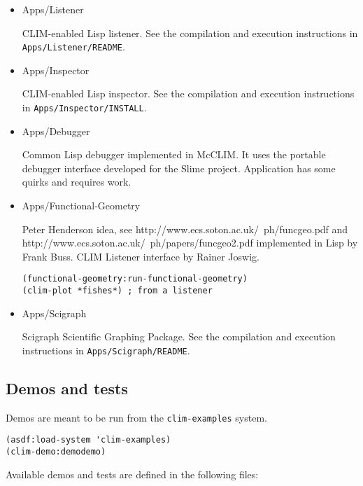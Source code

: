 \begin{itemize}
\item Apps/Listener

  CLIM-enabled Lisp listener.  See the compilation and execution
  instructions in \texttt{Apps/Listener/README}.

\item Apps/Inspector

  CLIM-enabled Lisp inspector.  See the compilation and execution
  instructions in \texttt{Apps/Inspector/INSTALL}.

\item Apps/Debugger

  Common Lisp debugger implemented in McCLIM. It uses the portable
  debugger interface developed for the Slime project. Application has
  some quirks and requires work.

\item Apps/Functional-Geometry

  Peter Henderson idea, see http://www.ecs.soton.ac.uk/~ph/funcgeo.pdf
  and http://www.ecs.soton.ac.uk/~ph/papers/funcgeo2.pdf implemented
  in Lisp by Frank Buss. CLIM Listener interface by Rainer Joswig.

\begin{verbatim}
(functional-geometry:run-functional-geometry)
(clim-plot *fishes*) ; from a listener
\end{verbatim}

\item Apps/Scigraph

  Scigraph Scientific Graphing Package. See the compilation and
  execution instructions in \texttt{Apps/Scigraph/README}.
\end{itemize}

\subsection{Demos and tests}

Demos are meant to be run from the \texttt{clim-examples} system.

\begin{verbatim}  
(asdf:load-system 'clim-examples)
(clim-demo:demodemo)
\end{verbatim}

Available demos and tests are defined in the following files:

